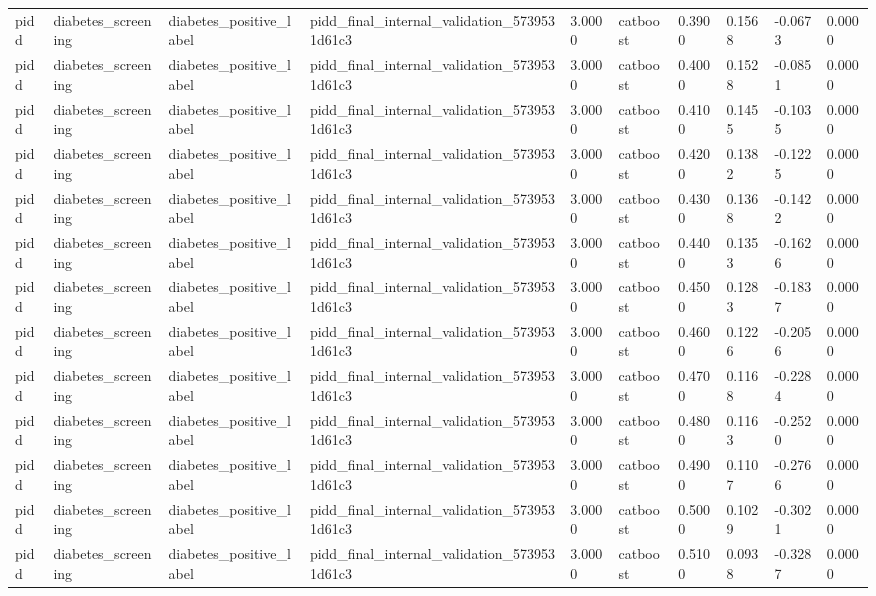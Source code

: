 \begin{tabular}{llllllllll}
pidd & diabetes\_screening & diabetes\_positive\_label & pidd\_final\_internal\_validation\_5739531d61c3 & 3.0000 & catboost & 0.3900 & 0.1568 & -0.0673 & 0.0000 \\
pidd & diabetes\_screening & diabetes\_positive\_label & pidd\_final\_internal\_validation\_5739531d61c3 & 3.0000 & catboost & 0.4000 & 0.1528 & -0.0851 & 0.0000 \\
pidd & diabetes\_screening & diabetes\_positive\_label & pidd\_final\_internal\_validation\_5739531d61c3 & 3.0000 & catboost & 0.4100 & 0.1455 & -0.1035 & 0.0000 \\
pidd & diabetes\_screening & diabetes\_positive\_label & pidd\_final\_internal\_validation\_5739531d61c3 & 3.0000 & catboost & 0.4200 & 0.1382 & -0.1225 & 0.0000 \\
pidd & diabetes\_screening & diabetes\_positive\_label & pidd\_final\_internal\_validation\_5739531d61c3 & 3.0000 & catboost & 0.4300 & 0.1368 & -0.1422 & 0.0000 \\
pidd & diabetes\_screening & diabetes\_positive\_label & pidd\_final\_internal\_validation\_5739531d61c3 & 3.0000 & catboost & 0.4400 & 0.1353 & -0.1626 & 0.0000 \\
pidd & diabetes\_screening & diabetes\_positive\_label & pidd\_final\_internal\_validation\_5739531d61c3 & 3.0000 & catboost & 0.4500 & 0.1283 & -0.1837 & 0.0000 \\
pidd & diabetes\_screening & diabetes\_positive\_label & pidd\_final\_internal\_validation\_5739531d61c3 & 3.0000 & catboost & 0.4600 & 0.1226 & -0.2056 & 0.0000 \\
pidd & diabetes\_screening & diabetes\_positive\_label & pidd\_final\_internal\_validation\_5739531d61c3 & 3.0000 & catboost & 0.4700 & 0.1168 & -0.2284 & 0.0000 \\
pidd & diabetes\_screening & diabetes\_positive\_label & pidd\_final\_internal\_validation\_5739531d61c3 & 3.0000 & catboost & 0.4800 & 0.1163 & -0.2520 & 0.0000 \\
pidd & diabetes\_screening & diabetes\_positive\_label & pidd\_final\_internal\_validation\_5739531d61c3 & 3.0000 & catboost & 0.4900 & 0.1107 & -0.2766 & 0.0000 \\
pidd & diabetes\_screening & diabetes\_positive\_label & pidd\_final\_internal\_validation\_5739531d61c3 & 3.0000 & catboost & 0.5000 & 0.1029 & -0.3021 & 0.0000 \\
pidd & diabetes\_screening & diabetes\_positive\_label & pidd\_final\_internal\_validation\_5739531d61c3 & 3.0000 & catboost & 0.5100 & 0.0938 & -0.3287 & 0.0000 \\

\end{tabular}

